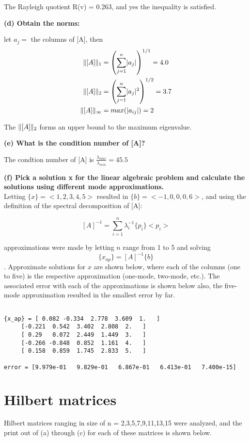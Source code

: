 \documentclass[letterpaper, 10pt, oneside]{article}
\newenvironment{dd}[1]{
	\noindent
	\textbf{\normalsize{#1}}
	\hspace{0.1in}
	\small
	\rmfamily
	}
	{\medskip}
\newcommand{\as}[1]{\begin{align*}#1\end{align*}}
\newcommand{\bdd}{\begin{dd}}
\newcommand{\edd}{\end{dd}}
\DeclarePairedDelimiter\abs{\lvert}{\rvert}%
\DeclarePairedDelimiter\norm{\lVert}{\rVert}%
\begin{document}
The Rayleigh quotient R({v}) = 0.263, and yes the inequality is satisfied.
\edd

\bdd{(d) Obtain the norms:}
let $a_j = $ the columns of [A], then
\as{
	\norm{[A]}_{1} &= \left( \sum_{j=1}^{n} \abs{a_j} \right)^{1/1} = 4.0\\
	\norm{[A]}_{2} &= \left( \sum_{j=1}^{n} \abs{a_j}^2 \right)^{1/2}= 3.7\\
	\norm{[A]}_{\infty} &= max(\abs{a_{ij}})= 2	}

	The  $\norm{[A]}_2$ forms an upper bound to the maximum eigenvalue.
\edd

\bdd{(e) What is the condition number of [A]?}
The condtion number of [A] is $\frac{\lambda_{max}}{\lambda_{min}}=45.5$
\edd

\bdd{(f) Pick a solution {x} for the linear algebraic problem and calculate the solutions using different mode approximations.} \\

Letting $\{x\} = <1,2,3,4,5>$ resulted in $\{b\} = <-1,0,0,0,6>$, and using the definition of the spectral decomposition of [A]:

$$[A]^{-1} = \sum_{i=1}^{n} \lambda_i^{-1} \{p_i\}<p_i>$$

approximations were made by letting $n$ range from 1 to 5 and solving $$\{x_{ap}\} = [A]^{-1}\{b\}$$.  Approximate solutions for $x$ are shown below, where each of the columns (one to five) is the respective approximation (one-mode, two-mode, etc.).  The associated error with each of the approximations is shown below also, the five-mode approximation resulted in the smallest error by far.

\begin{lstlisting}

{x_ap} = [ 0.082 -0.334  2.778  3.609  1.   ]
	 [-0.221  0.542  3.402  2.808  2.   ]
	 [ 0.29   0.072  2.449  1.449  3.   ]
	 [-0.266 -0.848  0.852  1.161  4.   ]
	 [ 0.158  0.859  1.745  2.833  5.   ]

error = [9.979e-01   9.829e-01   6.867e-01   6.413e-01   7.400e-15]
\end{lstlisting}
\edd


\section{Hilbert matrices}
Hilbert matrices ranging in size of n = 2,3,5,7,9,11,13,15 were analyzed, and the print out of (a) through (c) for each of these matrices is shown below. 
\end{document}

